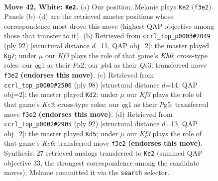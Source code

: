 \documentclass[11pt]{article}
\begin{document}
\clearpage

\begin{figure}[p]\centering
\begin{subfigure}{0.46\textwidth}\centering
\resizebox{\linewidth}{!}{%
\newchessgame
\chessboard[
  setfen={3k4/8/3n4/6b1/1p6/1P3K2/8/6q1 w - - 4 42},
  showmover=false,
  pgfstyle=straightmove, color=movearrow, markmove={f3-e2}
]}
\caption{}
\end{subfigure}\hfill
\begin{subfigure}{0.46\textwidth}\centering
\resizebox{\linewidth}{!}{%
\newchessgame
\chessboard[
  setfen={k2q4/8/p6K/8/8/2Q5/P7/8 w - - 3 47},
  showmover=false,
  pgfstyle=straightmove, color=movearrow, markmove={h6-g7}
]}
\caption{}
\end{subfigure}
\\[4pt]
\begin{subfigure}{0.46\textwidth}\centering
\resizebox{\linewidth}{!}{%
\newchessgame
\chessboard[
  setfen={8/8/8/5kP1/p7/P3K3/8/1b6 w - - 4 50},
  showmover=false,
  pgfstyle=straightmove, color=movearrow, markmove={e3-d2}
]}
\caption{}
\end{subfigure}\hfill
\begin{subfigure}{0.46\textwidth}\centering
\resizebox{\linewidth}{!}{%
\newchessgame
\chessboard[
  setfen={1b6/8/4K3/2p5/2N5/1P6/7k/8 w - - 2 47},
  showmover=false,
  pgfstyle=straightmove, color=movearrow, markmove={e6-d5}
]}
\caption{}
\end{subfigure}
\caption{\textbf{Move 42, White: \texttt{Ke2}.} (a) Our position; Melanie plays \texttt{Ke2} (\texttt{f3e2}). Panels (b)--(d) are the retrieved master positions whose correspondence most drove this move (highest QAP objective among those that transfer to it). (b) Retrieved from \texttt{ccrl\_top\_p0003\#2049} (ply 92) [structural distance $d$=11, QAP obj=2]: the master played \texttt{Kg7}; under $\mu$ our \emph{Kf3} plays the role of that game's \emph{Kh6}; cross-type roles: our \emph{q}g1 as their \emph{P}a2, our \emph{p}b4 as their \emph{Q}c3; transferred move \texttt{f3e2} \textbf{(endorses this move)}. (c) Retrieved from \texttt{ccrl\_top\_p0000\#2506} (ply 98) [structural distance $d$=14, QAP obj=2]: the master played \texttt{Kd2}; under $\mu$ our \emph{Kf3} plays the role of that game's \emph{Ke3}; cross-type roles: our \emph{q}g1 as their \emph{P}g5; transferred move \texttt{f3e2} \textbf{(endorses this move)}. (d) Retrieved from \texttt{ccrl\_top\_p0002\#2905} (ply 92) [structural distance $d$=13, QAP obj=2]: the master played \texttt{Kd5}; under $\mu$ our \emph{Kf3} plays the role of that game's \emph{Ke6}; transferred move \texttt{f3e2} \textbf{(endorses this move)}. Synthesis: 27 retrieved analogs transferred to \texttt{Ke2} (summed QAP objective 33, the strongest correspondence among the candidate moves); Melanie committed it via the \texttt{search} selector.}
\label{fig:thought-m82}
\end{figure}
\end{document}
